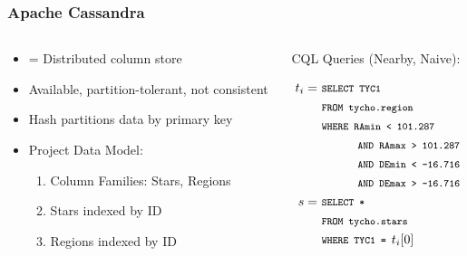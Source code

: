 \documentclass[11pt]{beamer}
\begin{document}
    \begin{frame}
        \frametitle{Apache Cassandra}
        \begin{columns}
            \begin{column}{0.5\textwidth}
                \begin{itemize}
                    \item = Distributed column store \bigskip
                    \item Available, partition-tolerant, not consistent \bigskip
                    \item Hash partitions data by primary key \bigskip
                    \item Project Data Model:
                    \begin{enumerate}
                        \item Column Families: Stars, Regions
                        \item Stars indexed by ID
                        \item Regions indexed by ID
                    \end{enumerate}
                \end{itemize}
            \end{column}
            \begin{column}{0.5\textwidth}
                \centerline{CQL Queries (Nearby, Naive):}
                \begin{align*}
                    t_i = \ &\texttt{\footnotesize SELECT TYC1} \\
                    &\texttt{\footnotesize FROM tycho.region} \\
                    &\texttt{\footnotesize WHERE RAmin < 101.287 } \\
                    &\texttt{\footnotesize \hspace*{1cm}AND RAmax > 101.287} \\
                    &\texttt{\footnotesize \hspace*{1cm}AND DEmin < -16.716} \\
                    &\texttt{\footnotesize \hspace*{1cm}AND DEmax > -16.716} \\
                    s = \ &\texttt{\footnotesize SELECT *} \\
                    &\texttt{\footnotesize FROM tycho.stars} \\
                    &\texttt{\footnotesize WHERE TYC1 = } t_i [0]
                \end{align*}
            \end{column}
        \end{columns}
    \end{frame}
    
\end{document}
